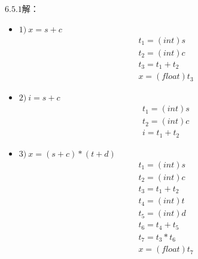 \documentclass[UTF8,noindent]{ctexart}
\begin{document}
$6.5.1$解：
\begin{itemize}
  \item $1)\ x = s+c$
  \begin{align*}
	& t_1 = (int) s\\
	& t_2 = (int)c\\
	& t_3 = t_1 + t_2\\
	& x = (float) t_3
  \end{align*}
\item $2)\ i = s+c$
\begin{align*}
	& t_1 = (int) s\\
	& t_2 = (int)c\\
	& i = t_1 + t_2
\end{align*}
\item  $3)\ x = (s+c) *(t+d)$
\begin{align*}
  & t_1 = (int)s\\
  & t_2 = (int)c\\
  & t_3 = t_1 + t_2\\
  & t_4 = (int )t\\
  & t_5 = (int )d\\
  & t_6 = t_4 + t_5\\
  & t_7 = t_3 * t_6\\
  & x = (float) t_7
\end{align*}
\end{itemize}
\end{document}
